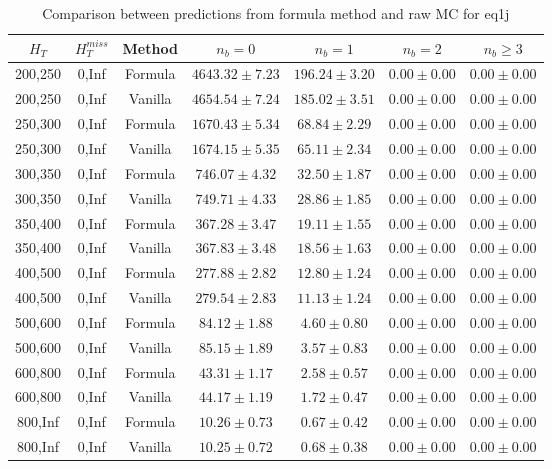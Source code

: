 
\begin{longtable}{ | c | c | c | c | c | c | c | }
\caption{Comparison between predictions from formula method and raw MC for eq1j} \label{tab:formula-eq1j} \\    \hline 
$H_{T}$ & $H_{T}^{miss}$ & Method & $n_{b} = 0$ & $n_{b} = 1$ & $n_{b} = 2$ & $n_{b} \ge 3$ \\ \hline200,250 & 0,Inf & Formula  & $  4643.32 \pm  7.23 $ & $   196.24 \pm  3.20 $ & $     0.00 \pm  0.00 $ & $     0.00 \pm  0.00 $  \\  
200,250 & 0,Inf & Vanilla  & $  4654.54 \pm  7.24 $ & $   185.02 \pm  3.51 $ & $     0.00 \pm  0.00 $ & $     0.00 \pm  0.00 $  \\ \hline 
250,300 & 0,Inf & Formula  & $  1670.43 \pm  5.34 $ & $    68.84 \pm  2.29 $ & $     0.00 \pm  0.00 $ & $     0.00 \pm  0.00 $  \\  
250,300 & 0,Inf & Vanilla  & $  1674.15 \pm  5.35 $ & $    65.11 \pm  2.34 $ & $     0.00 \pm  0.00 $ & $     0.00 \pm  0.00 $  \\ \hline 
300,350 & 0,Inf & Formula  & $   746.07 \pm  4.32 $ & $    32.50 \pm  1.87 $ & $     0.00 \pm  0.00 $ & $     0.00 \pm  0.00 $  \\  
300,350 & 0,Inf & Vanilla  & $   749.71 \pm  4.33 $ & $    28.86 \pm  1.85 $ & $     0.00 \pm  0.00 $ & $     0.00 \pm  0.00 $  \\ \hline 
350,400 & 0,Inf & Formula  & $   367.28 \pm  3.47 $ & $    19.11 \pm  1.55 $ & $     0.00 \pm  0.00 $ & $     0.00 \pm  0.00 $  \\  
350,400 & 0,Inf & Vanilla  & $   367.83 \pm  3.48 $ & $    18.56 \pm  1.63 $ & $     0.00 \pm  0.00 $ & $     0.00 \pm  0.00 $  \\ \hline 
400,500 & 0,Inf & Formula  & $   277.88 \pm  2.82 $ & $    12.80 \pm  1.24 $ & $     0.00 \pm  0.00 $ & $     0.00 \pm  0.00 $  \\  
400,500 & 0,Inf & Vanilla  & $   279.54 \pm  2.83 $ & $    11.13 \pm  1.24 $ & $     0.00 \pm  0.00 $ & $     0.00 \pm  0.00 $  \\ \hline 
500,600 & 0,Inf & Formula  & $    84.12 \pm  1.88 $ & $     4.60 \pm  0.80 $ & $     0.00 \pm  0.00 $ & $     0.00 \pm  0.00 $  \\  
500,600 & 0,Inf & Vanilla  & $    85.15 \pm  1.89 $ & $     3.57 \pm  0.83 $ & $     0.00 \pm  0.00 $ & $     0.00 \pm  0.00 $  \\ \hline 
600,800 & 0,Inf & Formula  & $    43.31 \pm  1.17 $ & $     2.58 \pm  0.57 $ & $     0.00 \pm  0.00 $ & $     0.00 \pm  0.00 $  \\  
600,800 & 0,Inf & Vanilla  & $    44.17 \pm  1.19 $ & $     1.72 \pm  0.47 $ & $     0.00 \pm  0.00 $ & $     0.00 \pm  0.00 $  \\ \hline 
800,Inf & 0,Inf & Formula  & $    10.26 \pm  0.73 $ & $     0.67 \pm  0.42 $ & $     0.00 \pm  0.00 $ & $     0.00 \pm  0.00 $  \\  
800,Inf & 0,Inf & Vanilla  & $    10.25 \pm  0.72 $ & $     0.68 \pm  0.38 $ & $     0.00 \pm  0.00 $ & $     0.00 \pm  0.00 $  \\ \hline 
    \hline 
    \hline 
\end{longtable}
